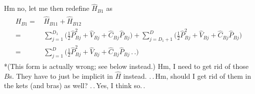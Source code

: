 \documentclass{report}
\begin{document}
Hm no, let me then redefine $\hat H_{B1}$ as
\begin{align}
\begin{aligned}
	\hat H_{B1} =&\, \hat H_{B11} + \hat H_{B12} \\=&\,
		\sum_{j=1}^{D_1} \big(
			\frac{1}{2} \hat P_{B j}^2 + 
			\hat V_{Bj} + 
			\hat C_{B j} \hat P_{B j}
		\big) +
		\sum_{j=D_1+1}^{D} \big(
			\frac{1}{2} \hat P_{B j}^2 + 
			\hat V_{Bj} + 
			\hat C_{B j} \hat P_{B j} 
		\big)\\=&\,
		\sum_{j=1}^{D} \big(
			\frac{1}{2} \hat P_{B j}^2 + 
			\hat V_{Bj} + 
			\hat C_{B j} \hat P_{B j} \,.\,.
		\big)
	\label{H_B1_02}
\end{aligned}
\end{align} 
*(This form is actually wrong; see below instead.) Hm, I need to get rid of those $B$s. They have to just be implicit in $\hat H$ instead. .\,.\,Hm, should I get rid of them in the kets (and bras) as well? .\,.\,Yes, I think so.\,. 
\end{document}

